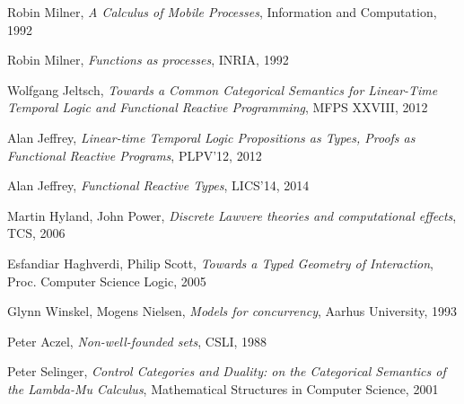 \documentclass{article}
\begin{document}
\begin{thebibliography}{99}
    Robin Milner,
    \emph{A Calculus of Mobile Processes},
    Information and Computation,
    1992

    Robin Milner,
    \emph{Functions as processes},
    INRIA,
    1992

    Wolfgang Jeltsch,
    \emph{Towards a Common Categorical Semantics for Linear-Time
      Temporal Logic and Functional Reactive Programming},
    MFPS XXVIII,
    2012

    Alan Jeffrey,
    \emph{Linear-time Temporal Logic Propositions as Types, Proofs as
      Functional Reactive Programs},
    PLPV'12,
    2012

    Alan Jeffrey,
    \emph{Functional Reactive Types},
    LICS'14,
    2014

    Martin Hyland, John Power,
    \emph{Discrete Lawvere theories and computational effects},
    TCS,
    2006

    Esfandiar Haghverdi, Philip Scott,
    \emph{Towards a Typed Geometry of Interaction},
    Proc. Computer Science Logic,
    2005

    Glynn Winskel, Mogens Nielsen,
    \emph{Models for concurrency},
    Aarhus University,
    1993

    Peter Aczel,
    \emph{Non-well-founded sets},
    CSLI,
    1988

    Peter Selinger,
    \emph{Control Categories and Duality: on the Categorical Semantics
    of the Lambda-Mu Calculus},
    Mathematical Structures in Computer Science,
    2001

\end{thebibliography}

\end{document}
